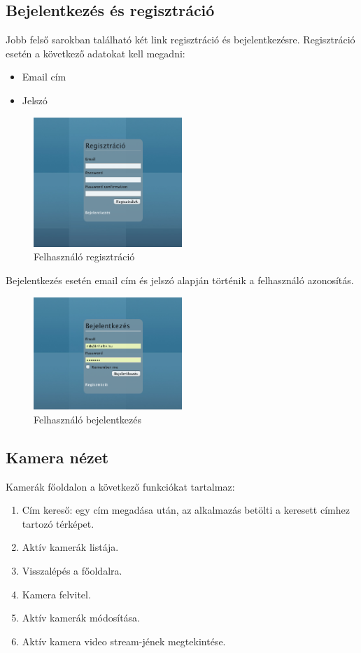 \subsection{Bejelentkezés és regisztráció} %
\label{sub:bejelentkezés_és_regisztráció}
Jobb felső sarokban található két link regisztráció és bejelentkezésre.
Regisztráció esetén a következő adatokat kell megadni:
\begin{itemize}
  \item Email cím
  \item Jelszó
\end{itemize} 
\begin{figure}[h!]
  \centering
  \includegraphics[width=0.5\textwidth]{chapters/chap4/register.png}
  \caption{Felhasználó regisztráció}
\end{figure}


Bejelentkezés esetén email cím és jelszó alapján történik a felhasználó azonosítás.

\begin{figure}[h!]
  \centering
  \includegraphics[width=0.5\textwidth]{chapters/chap4/login.png}
  \caption{Felhasználó bejelentkezés}
\end{figure}



\subsection{Kamera nézet} %
\label{sub:kamera_nézet}
Kamerák főoldalon a következő funkciókat tartalmaz:
\begin{enumerate}
  \item Cím kereső: egy cím megadása után, az alkalmazás betölti a keresett címhez tartozó térképet.
  \item Aktív kamerák listája.
  \item Visszalépés a főoldalra.
  \item Kamera felvitel.
  \item Aktív kamerák módosítása.
  \item Aktív kamera video stream-jének megtekintése.
\end{enumerate}

